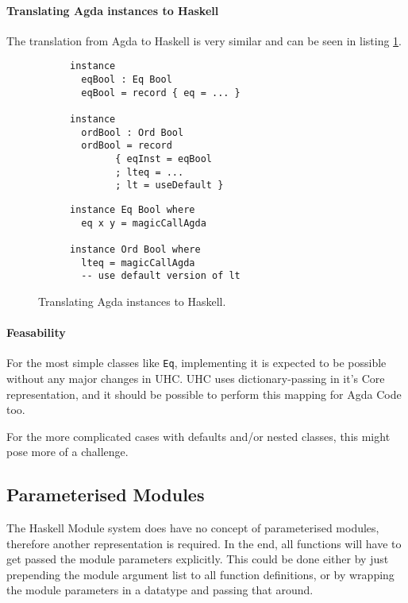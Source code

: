 \documentclass[12pt, a4paper, twoside]{report}
\begin{document}
\paragraph{Translating Agda instances to Haskell}
The translation from Agda to Haskell is very similar and can be seen in listing \ref{lst:inst-agda-hs}.
\begin{figure}
\begin{subfigure}[b]{0.5\textwidth}
\begin{lstlisting}
instance
  eqBool : Eq Bool
  eqBool = record { eq = ... }

instance
  ordBool : Ord Bool
  ordBool = record
        { eqInst = eqBool
        ; lteq = ...
        ; lt = useDefault }
\end{lstlisting}
\end{subfigure}
\hspace{10pt}
\begin{subfigure}[b]{0.5\textwidth}
\begin{lstlisting}
instance Eq Bool where
  eq x y = magicCallAgda

instance Ord Bool where
  lteq = magicCallAgda
  -- use default version of lt
\end{lstlisting}
\end{subfigure}
\caption{Translating Agda instances to Haskell.}
\label{lst:inst-agda-hs}
\end{figure}


\paragraph{Feasability}
For the most simple classes like \texttt{Eq}, implementing it is expected to be
possible without any major changes in UHC. UHC uses dictionary-passing in it's Core representation,
and it should be possible to perform this mapping for Agda Code too.

For the more complicated cases with defaults and/or nested classes, this might pose more of a challenge.

\subsection{Parameterised Modules}
\label{sec:ffi:par-mod}
The Haskell Module system does have no concept of parameterised modules, therefore another representation is required. In the end,
all functions will have to get passed the module parameters explicitly. This could be done either by just prepending the module
argument list to all function definitions, or by wrapping the module parameters in a datatype and passing that around.
\end{document}
